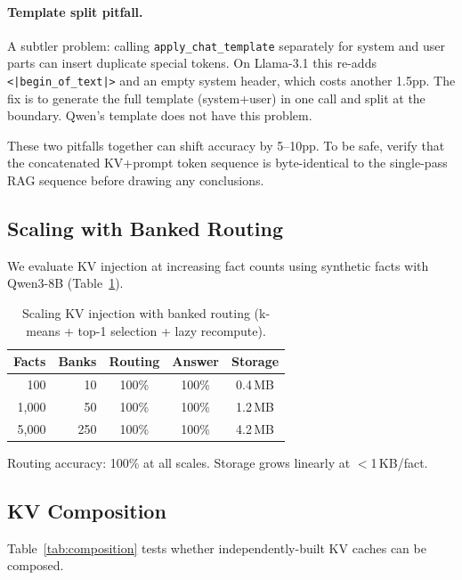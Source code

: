 \documentclass{article}
\begin{document}
\paragraph{Template split pitfall.} A subtler problem: calling \texttt{apply\_chat\_template} separately for system and user parts can insert duplicate special tokens. On Llama-3.1 this re-adds \texttt{<|begin\_of\_text|>} and an empty system header, which costs another 1.5pp. The fix is to generate the full template (system+user) in one call and split at the boundary. Qwen's template does not have this problem.

These two pitfalls together can shift accuracy by 5--10pp. To be safe, verify that the concatenated KV+prompt token sequence is byte-identical to the single-pass RAG sequence before drawing any conclusions.

\subsection{Scaling with Banked Routing}

We evaluate KV injection at increasing fact counts using synthetic facts with Qwen3-8B (Table~\ref{tab:scaling}).

\begin{table}[t]
\centering
\caption{Scaling KV injection with banked routing (k-means + top-1 selection + lazy recompute).}
\label{tab:scaling}
\begin{tabular}{rrccc}
\toprule
\textbf{Facts} & \textbf{Banks} & \textbf{Routing} & \textbf{Answer} & \textbf{Storage} \\
\midrule
100 & 10 & 100\% & 100\% & 0.4\,MB \\
1{,}000 & 50 & 100\% & 100\% & 1.2\,MB \\
5{,}000 & 250 & 100\% & 100\% & 4.2\,MB \\
\bottomrule
\end{tabular}
\end{table}

Routing accuracy: 100\% at all scales. Storage grows linearly at $<$1\,KB/fact.

\subsection{KV Composition}
\label{sec:composition}

Table~\ref{tab:composition} tests whether independently-built KV caches can be composed.
\end{document}
